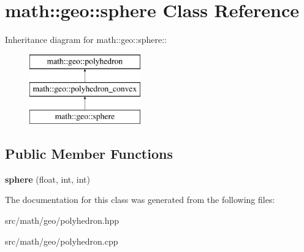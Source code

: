 \hypertarget{classmath_1_1geo_1_1sphere}{
\section{math::geo::sphere Class Reference}
\label{classmath_1_1geo_1_1sphere}
}
Inheritance diagram for math::geo::sphere::\begin{figure}[H]
\begin{center}
\leavevmode
\includegraphics[height=3cm]{classmath_1_1geo_1_1sphere}
\end{center}
\end{figure}
\subsection*{Public Member Functions}
\begin{DoxyCompactItemize}
\item 
\hypertarget{classmath_1_1geo_1_1sphere_ad30f9edddc96ef9c7a4062e79694556d}{
{\bfseries sphere} (float, int, int)}
\label{classmath_1_1geo_1_1sphere_ad30f9edddc96ef9c7a4062e79694556d}

\end{DoxyCompactItemize}


The documentation for this class was generated from the following files:\begin{DoxyCompactItemize}
\item 
src/math/geo/polyhedron.hpp\item 
src/math/geo/polyhedron.cpp\end{DoxyCompactItemize}
